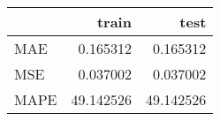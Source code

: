 \begin{tabular}{lrr}
\toprule
{} &      train &       test \\
\midrule
MAE  &   0.165312 &   0.165312 \\
MSE  &   0.037002 &   0.037002 \\
MAPE &  49.142526 &  49.142526 \\
\bottomrule
\end{tabular}
